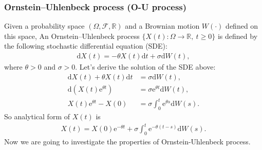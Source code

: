 \documentclass{article}
\begin{document}
\subsubsection{Ornstein–Uhlenbeck process (O-U process)}
Given a probability space $(\Omega,\mathcal{F},\mathbb{R})$ and a Brownian motion $W(\cdot)$ defined on this space, An Ornstein–Uhlenbeck process $\lbrace X(t): \Omega\to\mathbb{R},\ t\geq 0\rbrace$ is defined by the following stochastic differential equation (SDE):
\begin{align*}
	\mathrm{d}X(t) = -\theta X(t)\mathrm{d}t + \sigma\mathrm{d}W(t),\tag{3.13}
\end{align*}
where $\theta>0$ and $\sigma>0$. Let's derive the solution of the SDE above:
\begin{align*}\mathrm{d}X(t)  + \theta X(t)\mathrm{d}t &= \sigma\mathrm{d}W(t),\\
\mathrm{d}\left(X(t)\mathrm{e}^{\theta t}\right) &= \sigma\mathrm{e}^{\theta t}\mathrm{d}W(t),\\
X(t)\mathrm{e}^{\theta t} - X(0) &= \sigma\int_0^t\mathrm{e}^{\theta s}\mathrm{d}W(s).\tag{3.14}
\end{align*}
So analytical form of $X(t)$ is
\begin{align*}
	X(t) = X(0)\mathrm{e}^{-\theta t} + \sigma\int_0^t\mathrm{e}^{-\theta(t-s)}\mathrm{d}W(s).\tag{3.15}
\end{align*}
Now we are going to investigate the properties of Ornstein-Uhlenbeck process.
\end{document}
